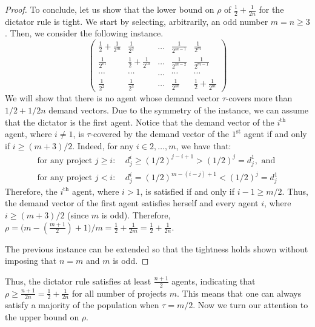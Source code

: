 \documentclass{article}
\begin{document}
\begin{proof}
To conclude, let us show that the lower bound on $\rho$ of $\frac{1}{2}+\frac{1}{2n}$ for the {\sc dictator} rule is tight.
We start by selecting, arbitrarily, an odd number $m = n \ge 3$. Then, we consider the following instance.
\begin{equation} \label{example_tight_dictator} \left( \begin{array}{ccccc}
\frac{1}{2}+ \frac{1}{2^m} & \frac{1}{2^2} & \ldots & \frac{1}{2^{m-1}} & \frac{1}{2^m} \\
\frac{1}{2^m} & \frac{1}{2}+ \frac{1}{2^m} & \ldots & \frac{1}{2^{m-2}} & \frac{1}{2^{m-1}} \\
\cdots & \cdots & \ldots & \cdots & \cdots \\
\frac{1}{2^2} & \frac{1}{2^3} & \ldots & \frac{1}{2^m} & \frac{1}{2} + \frac{1}{2^m} 
\end{array} \right)
\end{equation}
We will show that there is no agent whose demand vector $\tau$-covers more than $1/2 + 1/2n$ demand vectors.
Due to the symmetry of the instance, we can assume that the dictator is the first agent. Notice that the demand vector of the $i^{\text{th}}$ agent, where $i \neq 1$, is $\tau$-covered by the demand vector of the $1^{\text{st}}$ agent if and only if $i \ge (m+3)/2$. Indeed, for any $i \in {2, \ldots, m}$, we have that:
\begin{align*}
\text{for any project } j\ge i: &\ d_j^i \ge (1/2)^{j-i+1} > (1/2)^{j}= d_j^1, \text{ and} \\
\text{for any project } j < i: &\
d_j^i = (1/2)^{m-(i-j)+1} < (1/2)^{j}= d_j^1
\end{align*}
Therefore, the $i^{\text{th}}$ agent, where $i > 1$, is satisfied if and only if $i - 1 \ge m/2$. Thus, the demand vector of the first agent satisfies herself and every agent $i$, where $i \ge (m+3)/2$ (since $m$ is odd).
Therefore, $\rho =\big( m-(\frac{m+1}{2})+1\big)/m = \frac{1}{2} + \frac{1}{2m} = \frac{1}{2} + \frac{1}{2n}$.

The previous instance can be extended so that the tightness holds shown without imposing that $n=m$ and $m$ is odd. 
\end{proof}


Thus, the {\sc dictator} rule satisfies at least 
$\frac{n+1}{2}$ agents, indicating that $\rho \ge \frac{n+1}{2n}=\frac{1}{2}+\frac{1}{2n}$ for all number of projects $m$. 
This 
means that one can always satisfy a majority of the population when $\tau=m/2$.  
Now we turn our attention to the upper bound on $\rho$. 
\end{document}
